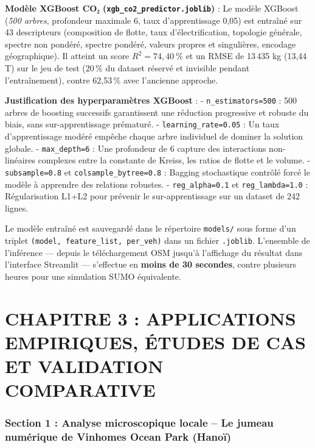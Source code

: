 \documentclass[10pt, a4paper]{article}
\begin{document}
\textbf{Modèle XGBoost CO₂ (\texttt{xgb\_co2\_predictor.joblib})} : Le
modèle XGBoost (\emph{500 arbres}, profondeur maximale 6, taux
d'apprentissage 0,05) est entraîné sur 43 descripteurs (composition de
flotte, taux d'électrification, topologie générale, spectre non pondéré,
spectre pondéré, valeurs propres et singulières, encodage géographique).
Il atteint un score \(R^2 = 74{,}40\ \%\) et un RMSE de 13\,435 kg
(13,44 T) sur le jeu de test (20\,\% du dataset réservé et invisible
pendant l'entraînement), contre 62,53\,\% avec l'ancienne approche.

\textbf{Justification des hyperparamètres XGBoost} : -
\texttt{n\_estimators=500} : 500 arbres de boosting successifs
garantissent une réduction progressive et robuste du biais, sans
sur-apprentissage prématuré. - \texttt{learning\_rate=0.05} : Un taux
d'apprentissage modéré empêche chaque arbre individuel de dominer la
solution globale. - \texttt{max\_depth=6} : Une profondeur de 6 capture
des interactions non-linéaires complexes entre la constante de Kreiss,
les ratios de flotte et le volume. - \texttt{subsample=0.8} et
\texttt{colsample\_bytree=0.8} : Bagging stochastique contrôlé forcé le
modèle à apprendre des relations robustes. - \texttt{reg\_alpha=0.1} et
\texttt{reg\_lambda=1.0} : Régularisation L1+L2 pour prévenir le
sur-apprentissage sur un dataset de 242 lignes.

Le modèle entraîné est sauvegardé dans le répertoire \texttt{models/}
sous forme d'un triplet
\texttt{(model,\ feature\_list,\ \textquotesingle{}per\_veh\textquotesingle{})}
dans un fichier \texttt{.joblib}. L'ensemble de l'inférence --- depuis
le téléchargement OSM jusqu'à l'affichage du résultat dans l'interface
Streamlit --- s'effectue en \textbf{moins de 30 secondes}, contre
plusieurs heures pour une simulation SUMO équivalente.

\newpage

\section{CHAPITRE 3 : APPLICATIONS EMPIRIQUES, ÉTUDES DE CAS ET
VALIDATION
COMPARATIVE}\label{chapitre-3-applications-empiriques-uxe9tudes-de-cas-et-validation-comparative}

\subsubsection{Section 1 : Analyse microscopique locale -- Le jumeau
numérique de Vinhomes Ocean Park
(Hanoï)}\label{section-1-analyse-microscopique-locale-le-jumeau-numuxe9rique-de-vinhomes-ocean-park-hanouxef}
\end{document}
